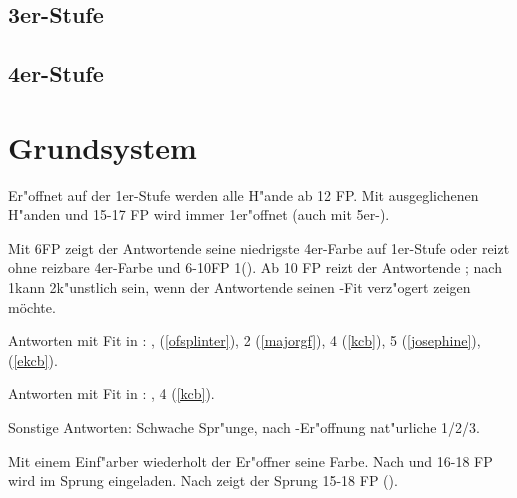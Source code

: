 \subsection*{3er-Stufe}

\subsection*{4er-Stufe}

%
%
\newpage
\section{Grundsystem}


Er"offnet auf der 1er-Stufe werden alle H"ande ab 12 FP. Mit ausgeglichenen
H"anden und 15-17 FP wird immer 1\SA er"offnet (auch mit 5er-\ofa).


Mit 6\pl FP zeigt der Antwortende seine niedrigste 4er-Farbe auf 1er-Stufe oder
reizt ohne reizbare 4er-Farbe und 6-10\bad FP 1\SA (). Ab 10\good{}\pl
FP reizt der Antwortende ; nach 1\of kann 2\tre k"unstlich sein,
wenn der Antwortende seinen \ofa-Fit verz"ogert zeigen möchte.

Antworten mit Fit in \ofa: ,
 (\ref{ofsplinter}),
2\SA {} (\ref{majorgf}),
4\SA {} (\ref{kcb}),
5\SA {} (\ref{josephine}),
 (\ref{ekcb}).

Antworten mit Fit in \ufa: , 4\uf {} (\ref{kcb}).

Sonstige Antworten: Schwache Spr"unge, nach \ufa-Er"offnung nat"urliche
1/2/3\sa.


Mit einem Einf"arber wiederholt der Er"offner seine Farbe. Nach 
und 16-18 FP wird im Sprung eingeladen. Nach  zeigt der Sprung 15-18 FP (\pf).

